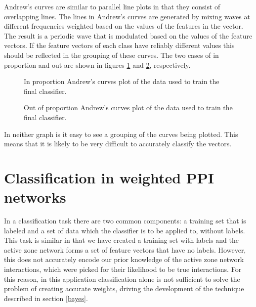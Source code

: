 Andrew's curves are similar to parallel line plots in that they consist of overlapping lines.
The lines in Andrew's curves are generated by mixing waves at different frequencies weighted based on the values of the features in the vector\autocite{andrews_plots_1972}.
The result is a periodic wave that is modulated based on the values of the feature vectors.
If the feature vectors of each class have reliably different values this should be reflected in the grouping of these curves.
The two cases of in proportion and out are shown in figures \ref{fig:inandcurve} and \ref{fig:outandcurve}, respectively.

\begin{figure}
    \setlength\figureheight{3in}
    \setlength\figurewidth{4in}
    \centering
    \caption{In proportion Andrew's curves plot of the data used to train the final classifier.}
    \label{fig:inandcurve}
\end{figure}

\begin{figure}
    \setlength\figureheight{3in}
    \setlength\figurewidth{4in}
    \centering
    \caption{Out of proportion Andrew's curves plot of the data used to train the final classifier.}
    \label{fig:outandcurve}
\end{figure}

In neither graph is it easy to see a grouping of the curves being plotted.
This means that it is likely to be very difficult to accurately classify the vectors.

\section{Classification in weighted PPI networks}

In a classification task there are two common components: a training set that is labeled and a set of data which the classifier is to be applied to, without labels.
This task is similar in that we have created a training set with labels and the active zone network forms a set of feature vectors that have no labels.
However, this does not accurately encode our prior knowledge of the active zone network interactions, which were picked for their likelihood to be true interactions.
For this reason, in this application classification alone is not sufficient to solve the problem of creating accurate weights, driving the development of the technique described in section \ref{bayes}.

